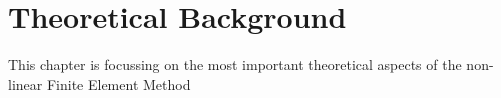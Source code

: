 \documentclass{book}
\begin{document}
\chapter{Theoretical Background} \label{theory}

This chapter is focussing on the most important theoretical aspects of the non-linear Finite Element Method
\end{document}
